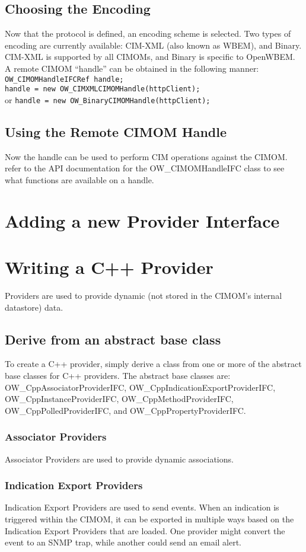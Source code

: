 \documentclass[letterpaper,10pt]{article}
\begin{document}
\subsection{Choosing the Encoding}
Now that the protocol is defined, an encoding scheme is selected.  
Two types of encoding are currently available: CIM-XML (also known as
WBEM), and Binary.  CIM-XML is supported by all CIMOMs, and Binary is 
specific to OpenWBEM.  A remote CIMOM ``handle'' can be obtained in 
the following manner:\\
\mbox{\texttt{OW\_CIMOMHandleIFCRef handle;}}\\
\mbox{\texttt{handle = new OW\_CIMXMLCIMOMHandle(httpClient);}}\\
or 
\mbox{\texttt{handle = new OW\_BinaryCIMOMHandle(httpClient);}}\\
\subsection{Using the Remote CIMOM Handle}
Now the handle can be used to perform CIM operations against the CIMOM.
refer to the API documentation for the OW\_CIMOMHandleIFC class to 
see what functions are available on a handle. 
\section{Adding a new Provider Interface}
\section{Writing a C++ Provider}
Providers are used to provide dynamic (not stored in the CIMOM's 
internal datastore) data.  
\subsection{Derive from an abstract base class}
To create a C++ provider, simply derive 
a class from one or more of the abstract base classes for C++ 
providers.  The abstract base classes are: 
\mbox{OW\_CppAssociatorProviderIFC},
\mbox{OW\_CppIndicationExportProviderIFC},
\mbox{OW\_CppInstanceProviderIFC},
\mbox{OW\_CppMethodProviderIFC},
\mbox{OW\_CppPolledProviderIFC}, and 
\mbox{OW\_CppPropertyProviderIFC}.
\subsubsection{Associator Providers}
Associator Providers are used to provide dynamic associations.
\subsubsection{Indication Export Providers}
Indication Export Providers are used to send events.  When an 
indication is triggered within the CIMOM, it can be exported in multiple
ways based on the Indication Export Providers that are loaded.  One provider 
might convert the event to an SNMP trap, while another could send an email
alert. 
\end{document}
